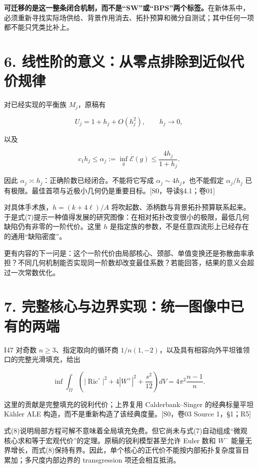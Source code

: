 \documentclass[UTF8,a4paper,11pt,fontset=fandol]{ctexart}
\begin{document}
\textbf{可迁移的是这一整条闭合机制，而不是``SW''或``BPS''两个标签。}在新体系中，必须重新寻找实际场供给、背景作用消去、拓扑预算和微分自测试；其中任何一项都不能只凭类比补上。

\section{6.
线性阶的意义：从零点排除到近似代价规律}\label{ux7ebfux6027ux9636ux7684ux610fux4e49ux4eceux96f6ux70b9ux6392ux9664ux5230ux8fd1ux4f3cux4ee3ux4ef7ux89c4ux5f8b}

对已经实现的平衡族 \(M_j\)，原稿有

\[
U_j=1+h_j+O(h_j^2),\qquad h_j\to0,
\]

以及

\[
\boxed{c_1h_j\le\alpha_j:=\inf_g\mathcal E(g)
\le\frac{4h_j}{1+h_j}.}
\tag{7}
\]

因此 \(\alpha_j\asymp h_j\)：正确阶数已经闭合。不能将它写成
\(\alpha_j\sim4h_j\)，也不能假定 \(\alpha_j/h_j\)
已有极限。最佳首项与近极小几何仍是重要目标。{[}S0，导读§4.1；卷01{]}

对具体手术族，\(h=(k+4\ell)/A\)
将吹起数、添柄数与背景拓扑预算联系起来。于是式(7)提示一种值得发展的研究图像：在相对拓扑改变很小的极限，最低几何缺陷仍有非零的一阶代价。这里
\(h\) 是指定族的参数，不是任意四流形上已经存在的通用``缺陷密度''。

更有内容的下一问是：这个一阶代价由局部核心、颈部、单值变换还是弥散曲率承担？不同几何机制能否实现同一阶数却改变最佳系数？若能回答，结果的意义会超过一次常数优化。

\section{7.
完整核心与边界实现：统一图像中已有的两端}\label{ux5b8cux6574ux6838ux5fc3ux4e0eux8fb9ux754cux5b9eux73b0ux7edfux4e00ux56feux50cfux4e2dux5df2ux6709ux7684ux4e24ux7aef}

I47 对奇数 \(n\ge3\)、指定取向的循环商
\(1/n(1,-2)\)，以及具有相容向外平坦锥领口的完整光滑填充，给出

\[
\boxed{
\inf\int_\Omega
\left(|\operatorname{Ric}^{\circ}|^2+4|W^+|^2+\frac{s^2}{12}\right)dV
=4\pi^2\frac{n-1}{n}.
}
\tag{8}
\]

这里的贡献是完整填充的锐利代价；上界复用 Calderbank--Singer
的经典标量平坦 Kähler ALE 构造，而不是重新构造了该经典度量。{[}S0，卷03
Source 1，§1；R5{]}

式(8)说明局部方程可解不意味着全局填充免费。但它尚未与式(7)自动组成``微观核心求和等于宏观代价''的定理。原稿的锐利模型甚至允许
Euler 数和 \(W^-\)
能量无界增长，而式(8)保持有界。因此，单个核心的正代价不能按内部拓扑复杂度盲目累加；多尺度内部边界的
transgression 项还会相互抵消。
\end{document}
